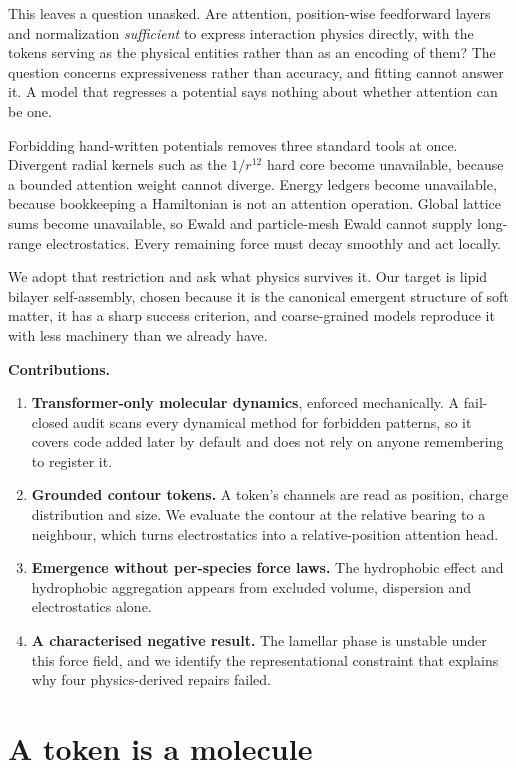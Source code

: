 \documentclass[10pt,twocolumn]{article}
\begin{document}
This leaves a question unasked. Are attention, position-wise feedforward layers and normalization
\emph{sufficient} to express interaction physics directly, with the tokens serving as the physical
entities rather than as an encoding of them? The question concerns expressiveness rather than
accuracy, and fitting cannot answer it. A model that regresses a potential says nothing about whether
attention can be one.

Forbidding hand-written potentials removes three standard tools at once. Divergent radial kernels
such as the $1/r^{12}$ hard core become unavailable, because a bounded attention weight cannot
diverge. Energy ledgers become unavailable, because bookkeeping a Hamiltonian is not an attention
operation. Global lattice sums become unavailable, so Ewald and particle-mesh Ewald cannot supply
long-range electrostatics. Every remaining force must decay smoothly and act locally.

We adopt that restriction and ask what physics survives it. Our target is lipid bilayer
self-assembly, chosen because it is the canonical emergent structure of soft matter, it has a sharp
success criterion, and coarse-grained models reproduce it with less machinery than we already have.

\smallskip
\noindent\textbf{Contributions.}
\begin{enumerate}\itemsep2pt
\item \textbf{Transformer-only molecular dynamics}, enforced mechanically. A fail-closed audit scans
every dynamical method for forbidden patterns, so it covers code added later by default and does not
rely on anyone remembering to register it.
\item \textbf{Grounded contour tokens.} A token's channels are read as position, charge distribution
and size. We evaluate the contour at the relative bearing to a neighbour, which turns electrostatics into a
relative-position attention head.
\item \textbf{Emergence without per-species force laws.} The hydrophobic effect and hydrophobic aggregation
appears from excluded volume, dispersion and electrostatics alone.
\item \textbf{A characterised negative result.} The lamellar phase is unstable under this force
field, and we identify the representational constraint that explains why four physics-derived
repairs failed.
\end{enumerate}

\section{A token is a molecule}
\end{document}
